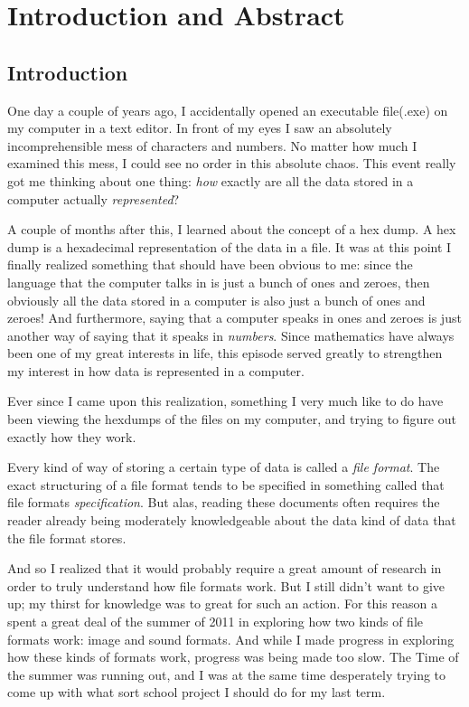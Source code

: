 \begin{comment}
  
\end{comment}


\chapter{Introduction and Abstract}

\section{Introduction}

One day a couple of years ago, I accidentally opened an executable
file(.exe) on my computer in a text editor. In front of my eyes I saw
an absolutely incomprehensible mess of characters and numbers. No
matter how much I examined this mess, I could see no order in this
absolute chaos. This event really got me thinking about one thing:
\textit{how} exactly are all the data stored in a computer actually
\textit{represented}?

A couple of months after this, I learned about the concept of a hex
dump. A hex dump is a hexadecimal representation of the data in a
file. It was at this point I finally realized something that should
have been obvious to me: since the language that the computer talks in
is just a bunch of ones and zeroes, then obviously all the data stored
in a computer is also just a bunch of ones and zeroes! And
furthermore, saying that a computer speaks in ones and zeroes is just
another way of saying that it speaks in \textit{numbers}. Since
mathematics have always been one of my great interests in life, this
episode served greatly to strengthen my interest in how data is
represented in a computer.

Ever since I came upon this realization, something I very much like to
do have been viewing the hexdumps of the files on my computer, and
trying to figure out exactly how they work. %

Every kind of way of storing a certain type of data is called a
\textit{file format}. The exact structuring of a file format tends to
be specified in something called that file formats
\textit{specification}. But alas, reading these documents often
requires the reader already being moderately knowledgeable about the
data kind of data that the file format stores.

And so I realized that it would probably require a great amount of
research in order to truly understand how file formats work. But I
still didn't want to give up; my thirst for knowledge was to great for
such an action.  For this reason a spent a great deal of the summer of
2011 in exploring how two kinds of file formats work: image and sound
formats. And while I made progress in exploring how these kinds of
formats work, progress was being made too slow. The Time of the summer
was running out, and I was at the same time desperately trying to come
up with what sort school project I should do for my last term.

